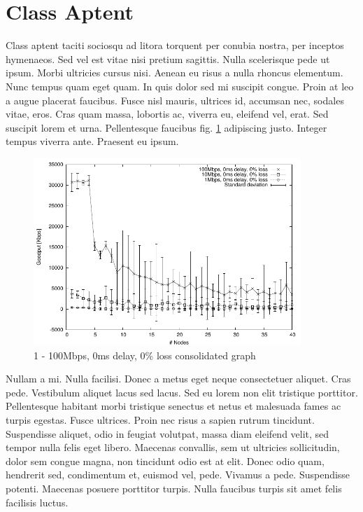 \section{Class Aptent}\label{NullaPorta_ClassAptent}
Class aptent taciti sociosqu ad litora torquent per conubia nostra, per inceptos hymenaeos. Sed vel est vitae nisi pretium sagittis. Nulla scelerisque pede ut ipsum. Morbi ultricies cursus nisi. Aenean eu risus a nulla rhoncus elementum. Nunc tempus quam eget quam. In quis dolor sed mi suscipit congue. Proin at leo a augue placerat faucibus. Fusce nisl mauris, ultrices id, accumsan nec, sodales vitae, eros. Cras quam massa, lobortis ac, viverra eu, eleifend vel, erat. Sed suscipit lorem et urna. Pellentesque faucibus fig. \ref{fig: NullaPorta_ClassAptent_NoLoss} adipiscing justo. Integer tempus viverra ante. Praesent eu ipsum. 

\begin{figure}[hbtp]
        \begin{center}
                \includegraphics[width=0.9\textwidth]{01_chapters/02/figs/1000-100000_0_0.pdf}
        \end{center}
        \caption{1 - 100Mbps, 0ms delay, 0\% loss consolidated graph}
        \label{fig: NullaPorta_ClassAptent_NoLoss}
\end{figure}

Nullam a mi. Nulla facilisi. Donec a metus eget neque consectetuer aliquet. Cras pede. Vestibulum aliquet lacus sed lacus. Sed eu lorem non elit tristique porttitor. Pellentesque habitant morbi tristique senectus et netus et malesuada fames ac turpis egestas. Fusce ultrices. Proin nec risus a sapien rutrum tincidunt. Suspendisse aliquet, odio in feugiat volutpat, massa diam eleifend velit, sed tempor nulla felis eget libero. Maecenas convallis, sem ut ultricies sollicitudin, dolor sem congue magna, non tincidunt odio est at elit. Donec odio quam, hendrerit sed, condimentum et, euismod vel, pede. Vivamus a pede. Suspendisse potenti. Maecenas posuere porttitor turpis. Nulla faucibus turpis sit amet felis facilisis luctus. 


